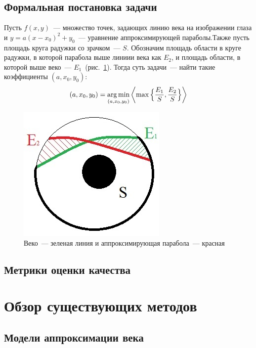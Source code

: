 \documentclass[12pt]{article} %
\begin{document}
\subsection{Формальная постановка задачи}

Пусть $f(x, y)$~--- множество точек, задающих линию века на изображении глаза и
\newline $y=a(x-x_0)^2 + y_0$~--- уравнение аппроксимирующей параболы.Также пусть площадь круга радужки со зрачком~--- $S$.
Обозначим площадь области в круге радужки, в которой парабола выше линиии века как $E_2$, и площадь области, в которой выше веко~--- $E_1$~(рис.~\ref{fig:glaz8}). Тогда суть задачи~--- найти такие коэффициенты $(a,x_0,y_0)$:
\begin{gather}\label{minimax}
	(a,x_0, y_0)=\mathop{\rm arg\,min}\limits_{(a,x_0,y_0)}\left<\max{\Bigl\{\frac{E_1}{S}, \frac{E_2}{S}\Bigr\}}\right>
\end{gather}

\begin{figure}[h]
	
	\centering
	
	\includegraphics[width=0.5\linewidth]{glaz8.jpg}
	
	\caption{Веко~--- зеленая линия и аппроксимирующая парабола~--- красная}
	
	\label{fig:glaz8}
	
\end{figure}
\newpage
\subsection{Метрики оценки качества}


\newpage
\section{Обзор существующих методов}
\subsection{Модели аппроксимации века}
\end{document}
